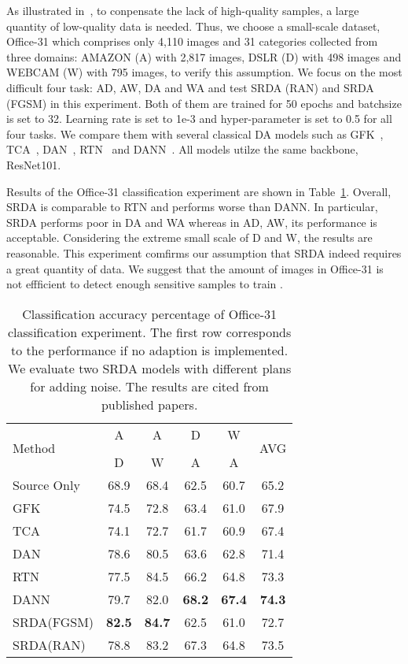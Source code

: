 \documentclass[10pt,twocolumn,letterpaper]{article}
\begin{document}
As illustrated in~\cite{Ben-David2014}, to conpensate the lack of high-quality samples, a large quantity of low-quality data is needed. Thus, we choose a small-scale dataset, Office-31 which comprises only 4,110 images and 31 categories collected from three domains: AMAZON (A) with 2,817 images, DSLR (D) with 498 images and WEBCAM (W) with 795 images, to verify this assumption. We focus on the most difficult four task: AD, AW, DA and WA and test SRDA (RAN) and SRDA (FGSM) in this experiment. Both of them are trained for 50 epochs and batchsize is set to 32. Learning rate is set to 1e-3 and hyper-parameter  is set to 0.5 for all four tasks. We compare them with several classical DA models such as GFK~\cite{gong2012geodesic}, TCA~\cite{pan2010domain}, DAN~\cite{pmlr-v37-long15}, RTN~\cite{long2016unsupervised} and DANN~\cite{ganin2016domain}. All models utilze the same backbone, ResNet101. 

Results of the Office-31 classification experiment are shown in Table~\ref{tab:office31}. Overall, SRDA is comparable to RTN and performs worse than DANN. In particular, SRDA performs poor in DA and WA whereas in AD, AW, its performance is acceptable. Considering the extreme small scale of D and W, the results are reasonable. This experiment comfirms our assumption that SRDA indeed requires a great quantity of data. We suggest that the amount of images in Office-31 is not effficient to detect enough sensitive samples to train . 

\begin{table}[htbp]
\centering
\caption{Classification accuracy percentage of Office-31 classification experiment. The first row corresponds to the performance if no adaption is implemented.  We evaluate two SRDA models with different plans for adding noise. The results are cited from published papers.}
\label{tab:office31}
\begin{tabular}{l|ccccc}
\hline\hline
\multirow{3}{*}{Method}& A &A & D & W & \multirow{3}{*}{AVG}\\
& &  &  & &\\
&D & W &A &A&\\
\hline
Source Only&68.9& 68.4 &62.5 &60.7&65.2\\
\hline
GFK~\cite{gong2012geodesic}& 74.5 & 72.8 & 63.4 & 61.0&67.9\\
TCA~\cite{pan2010domain}& 74.1 & 72.7 & 61.7 & 60.9&67.4\\
DAN~\cite{pmlr-v37-long15}&78.6&80.5&63.6&62.8&71.4\\
RTN~\cite{long2016unsupervised}& 77.5 & 84.5 & 66.2 & 64.8& 73.3\\
DANN~\cite{ganin2016domain}&79.7& 82.0&{\bf 68.2}& {\bf 67.4}&{\bf 74.3}\\
\hline
SRDA(FGSM)&{\bf 82.5}&{\bf 84.7}&62.5&61.0&72.7\\
SRDA(RAN)&78.8&83.2&67.3&64.8&73.5\\
\hline\hline
\end{tabular}
\end{table}
\end{document}
